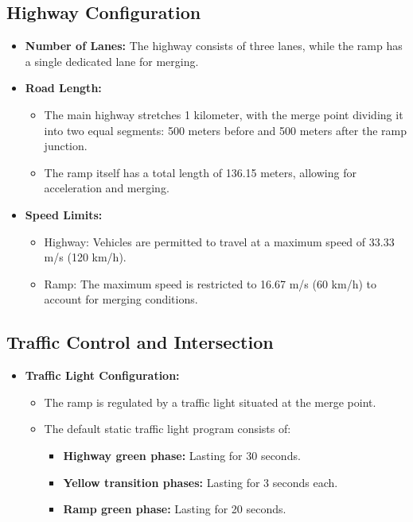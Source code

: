 \documentclass[a4paper, 12pt]{article}
\begin{document}
\subsection{Highway Configuration}
\begin{itemize}
    \item \textbf{Number of Lanes:} The highway consists of three lanes, while the ramp has a single dedicated lane for merging.
    \item \textbf{Road Length:}
    \begin{itemize}
        \item The main highway stretches 1 kilometer, with the merge point dividing it into two equal segments: 500 meters before and 500 meters after the ramp junction.
        \item The ramp itself has a total length of 136.15 meters, allowing for acceleration and merging.
    \end{itemize}
    \item \textbf{Speed Limits:}
    \begin{itemize}
        \item Highway: Vehicles are permitted to travel at a maximum speed of 33.33 m/s (120 km/h).
        \item Ramp: The maximum speed is restricted to 16.67 m/s (60 km/h) to account for merging conditions.
    \end{itemize}
\end{itemize}

\subsection{Traffic Control and Intersection}
\begin{itemize}
    \item \textbf{Traffic Light Configuration:}
    \begin{itemize}
        \item The ramp is regulated by a traffic light situated at the merge point.
        \item The default static traffic light program consists of:
        \begin{itemize}
            \item \textbf{Highway green phase:} Lasting for 30 seconds.
            \item \textbf{Yellow transition phases:} Lasting for 3 seconds each.
            \item \textbf{Ramp green phase:} Lasting for 20 seconds.
        \end{itemize}
    \end{itemize}
\end{itemize}
\end{document}

